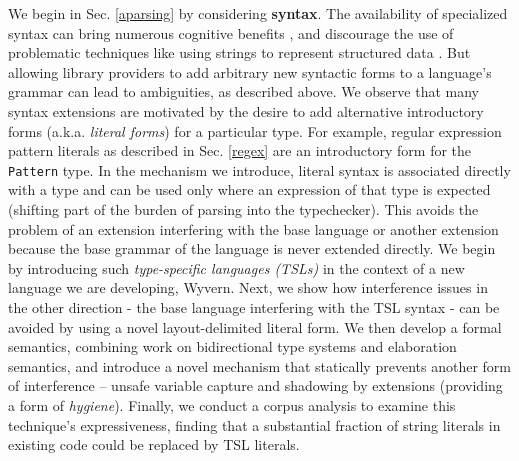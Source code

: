 We begin in Sec. \ref{aparsing} by considering \textbf{syntax}. The availability of specialized syntax can bring numerous cognitive benefits \cite{green1996usability}, and discourage the use of problematic techniques like using strings to represent structured data \cite{Bravenboer:2007:PIA:1289971.1289975}. But allowing library providers to add arbitrary new syntactic forms to a language's grammar can lead to ambiguities, as described above. We observe that many syntax extensions are motivated by the desire to add alternative  introductory forms (a.k.a. \emph{literal forms}) for a particular type. For example, regular expression pattern literals as described in Sec. \ref{regex} are an introductory form for the \verb|Pattern| type.  In the mechanism we introduce, literal syntax is associated directly with a type and can be used only where an expression of that type is expected (shifting part of the burden of parsing into the typechecker). This avoids the problem of an extension interfering with the base language or another extension  because the base grammar of the language is never extended directly. We begin by introducing such \emph{type-specific languages (TSLs)} in the context of a new language we are developing, Wyvern. Next, we show how interference issues in the other direction - the base language interfering with  the TSL syntax - can be avoided by using a novel layout-delimited literal form. We then develop a formal semantics, combining work on bidirectional type systems and elaboration semantics, and introduce a novel mechanism that statically prevents another form of interference -- unsafe variable capture and shadowing by extensions (providing a form of \emph{hygiene}). Finally, we conduct a corpus analysis to examine this technique's expressiveness, finding that a substantial fraction of string literals in existing code could be replaced by TSL literals.

